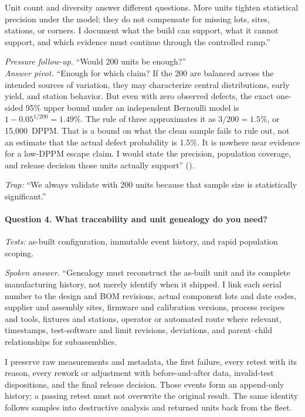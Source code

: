 Unit count and diversity answer different questions. More units tighten
statistical precision under the model; they do not compensate for missing lots,
sites, stations, or corners. I document what the build can support, what it
cannot support, and which evidence must continue through the controlled ramp.''

\textit{Pressure follow-up.} ``Would 200 units be enough?''\\
\textit{Answer pivot.} ``Enough for which claim? If the 200 are balanced across
the intended sources of variation, they may characterize central distributions,
early yield, and station behavior. But even with zero observed defects, the
exact one-sided 95\% upper bound under an independent Bernoulli model is
$1-0.05^{1/200}=1.49\%$. The rule of three approximates it as $3/200=1.5\%$,
or 15{,}000~DPPM. That is a bound on what the clean sample fails to rule out,
not an estimate that the actual defect probability is 1.5\%. It is nowhere near
evidence for a low-DPPM escape claim. I would state the precision, population
coverage, and release decision those units actually support''
().

\textit{Trap:} ``We always validate with 200 units because that sample size is
statistically significant.''

\paragraph{Question 4. What traceability and unit genealogy do you need?}
\textit{Tests:} as-built configuration, immutable event history, and rapid
population scoping.

\textit{Spoken answer.}
``Genealogy must reconstruct the as-built unit and its complete manufacturing
history, not merely identify when it shipped. I link each serial number to the
design and BOM revisions, actual component lots and date codes, supplier and
assembly sites, firmware and calibration versions, process recipes and tools,
fixtures and stations, operator or automated route where relevant, timestamps,
test-software and limit revisions, deviations, and parent--child relationships
for subassemblies.

I preserve raw measurements and metadata, the first failure, every retest with
its reason, every rework or adjustment with before-and-after data, invalid-test
dispositions, and the final release decision. Those events form an append-only
history; a passing retest must not overwrite the original result. The same
identity follows samples into destructive analysis and returned units back from
the fleet.

